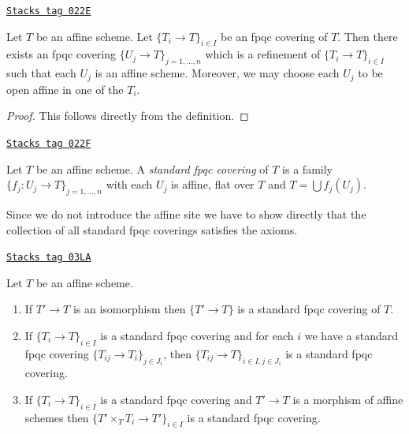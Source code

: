 \begin{lemma}
\label{topologies-lemma-fpqc-affine}
\href{https://stacks.math.columbia.edu/tag/022E}{\texttt{Stacks tag 022E}}

Let $T$ be an affine scheme.
Let $\{T_i \to T\}_{i \in I}$ be an fpqc covering of $T$.
Then there exists an fpqc covering
$\{U_j \to T\}_{j = 1, \ldots, n}$ which is a refinement
of $\{T_i \to T\}_{i \in I}$ such that each $U_j$ is an affine
scheme. Moreover, we may choose each $U_j$ to be open affine
in one of the $T_i$.
\end{lemma}

\begin{proof}
This follows directly from the definition.
\end{proof}

\begin{definition}
\label{topologies-definition-standard-fpqc}
\href{https://stacks.math.columbia.edu/tag/022F}{\texttt{Stacks tag 022F}}

Let $T$ be an affine scheme. A {\it standard fpqc covering}
of $T$ is a family $\{f_j : U_j \to T\}_{j = 1, \ldots, n}$
with each $U_j$ is affine, flat over $T$ and $T = \bigcup f_j(U_j)$.
\end{definition}

Since we do not introduce the affine site we have to show directly
that the collection of all standard fpqc coverings satisfies the
axioms.

\begin{lemma}
\label{topologies-lemma-fpqc-affine-axioms}
\href{https://stacks.math.columbia.edu/tag/03LA}{\texttt{Stacks tag 03LA}}

Let $T$ be an affine scheme.
\begin{enumerate}
\item If $T' \to T$ is an isomorphism then $\{T' \to T\}$
is a standard fpqc covering of $T$.
\item If $\{T_i \to T\}_{i\in I}$ is a standard fpqc covering and for each
$i$ we have a standard fpqc covering $\{T_{ij} \to T_i\}_{j\in J_i}$, then
$\{T_{ij} \to T\}_{i \in I, j\in J_i}$ is a standard fpqc covering.
\item If $\{T_i \to T\}_{i\in I}$ is a standard fpqc covering
and $T' \to T$ is a morphism of affine schemes then
$\{T' \times_T T_i \to T'\}_{i\in I}$ is a standard fpqc covering.
\end{enumerate}
\end{lemma}

